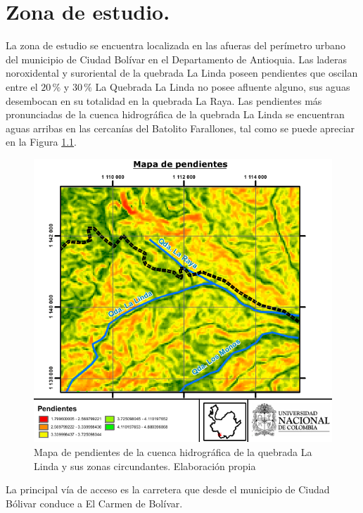 \chapter{Zona de estudio.}
\label{chap_zonaEstudio}

La zona de estudio se encuentra localizada en las afueras del per\'imetro urbano del municipio de Ciudad Bol\'ivar en el Departamento de Antioquia. 
Las laderas noroxidental y suroriental de la quebrada La Linda poseen pendientes que oscilan entre el \(20\,\%\) y \(30\,\%\)
La Quebrada La Linda no posee afluente alguno, sus aguas desembocan en su totalidad en la quebrada La Raya.
Las pendientes m\'as pronunciadas de la cuenca hidrogr\'afica de la quebrada La Linda se encuentran aguas arribas en las cercan\'ias del Batolito Farallones, tal como se puede apreciar en la Figura \ref{fig:slopes}.

\begin{figure}[H]
\centering
\includegraphics[scale=1]{img/pendientes.pdf}
\caption{Mapa de pendientes de la cuenca hidrogr\'afica de la quebrada La Linda y sus zonas circundantes. Elaboraci\'on propia}
\label{fig:slopes}
\end{figure}
La principal v\'ia de acceso es la carretera que desde el municipio de Ciudad B\'olivar conduce a El Carmen de Bol\'ivar.
